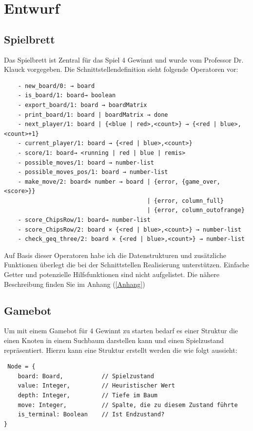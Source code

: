 %

\section{Entwurf}

\subsection{Spielbrett}

Das Spielbrett ist Zentral für das Spiel 4 Gewinnt und wurde vom Professor Dr. Klauck vorgegeben. Die Schnittstellendefinition sieht folgende Operatoren vor:

\begin{verbatim}
	- new_board/0: → board
	- is_board/1: board→ boolean
	- export_board/1: board → boardMatrix
	- print_board/1: board | boardMatrix → done
	- next_player/1: board | {<blue | red>,<count>} → {<red | blue>,<count>+1}
	- current_player/1: board → {<red | blue>,<count>}
	- score/1: board→ <running | red | blue | remis>
	- possible_moves/1: board → number-list
	- possible_moves_pos/1: board → number-list
	- make_move/2: board× number → board | {error, {game_over,<score>}} 
	                                     | {error, column_full} 
	                                     | {error, column_outofrange}
	- score_ChipsRow/1: board→ number-list
	- score_ChipsRow/2: board × {<red | blue>,<count>} → number-list
	- check_geq_three/2: board × {<red | blue>,<count>} → number-list
\end{verbatim}

Auf Basis dieser Operatoren habe ich die Datenstrukturen und zusätzliche Funktionen überlegt die bei der Schnittstellen Realisierung unterstützen. Einfache Getter und potenzielle Hilfsfunktionen sind nicht aufgelistet. Die nähere Beschreibung finden Sie im Anhang (\ref{Anhang})

\newpage

\subsection[Gamebot]{Gamebot}
\label{gamebot}

Um mit einem Gamebot für 4 Gewinnt zu starten bedarf es einer Struktur die einen Knoten in einem Suchbaum darstellen kann und einen Spielzustand repräsentiert. Hierzu kann eine Struktur erstellt werden die wie folgt aussieht: 
\begin{verbatim} Node = {
	board: Board,           // Spielzustand
	value: Integer,         // Heuristischer Wert
	depth: Integer,         // Tiefe im Baum
	move: Integer,          // Spalte, die zu diesem Zustand führte
	is_terminal: Boolean    // Ist Endzustand?
} \end{verbatim}

